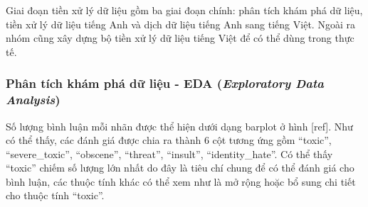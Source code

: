 Giai đoạn tiền xử lý dữ liệu gồm ba giai đoạn chính: phân tích khám phá dữ liệu, tiền xử lý dữ liệu tiếng Anh và dịch dữ liệu tiếng Anh sang tiếng Việt. Ngoài ra nhóm cũng xây dựng bộ tiền xử lý dữ liệu tiếng Việt để có thể dùng trong thực tế.

\subsubsection{Phân tích khám phá dữ liệu - EDA (\textit{Exploratory Data Analysis})}
Số lượng bình luận mỗi nhãn được thể hiện dưới dạng barplot ở hình [ref]. Như có thể thấy, các đánh giá được chia ra thành 6 cột tương ứng gồm ``toxic'', ``severe\_toxic'', ``obscene'', ``threat'', ``insult'', ``identity\_hate''. Có thể thấy ``toxic'' chiếm số lượng lớn nhất do đây là tiêu chí chung để có thể đánh giá cho bình luận, các thuộc tính khác có thể xem như là mở rộng hoặc bổ sung chi tiết cho thuộc tính ``toxic''.


